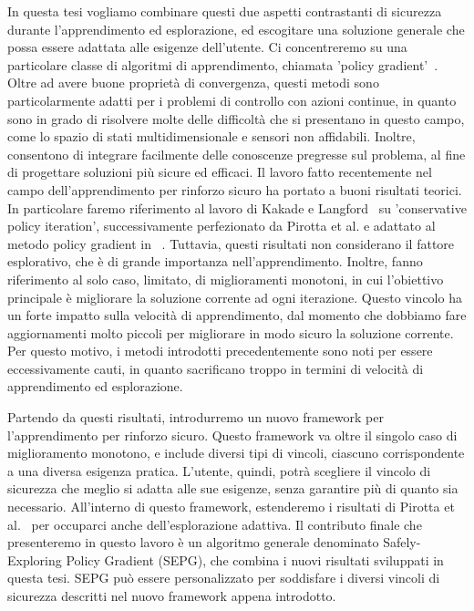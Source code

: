 In questa tesi vogliamo combinare questi due aspetti contrastanti di sicurezza durante l'apprendimento ed esplorazione, ed escogitare una soluzione generale che possa essere adattata alle esigenze dell'utente. Ci concentreremo su una particolare classe di algoritmi di apprendimento, chiamata 'policy gradient'~\cite{peters}. Oltre ad avere buone proprietà di convergenza, questi metodi sono particolarmente adatti per i problemi di controllo con azioni continue, in quanto sono in grado di risolvere molte delle difficoltà che si presentano in questo campo, come lo spazio di stati multidimensionale e sensori non affidabili. Inoltre, consentono di integrare facilmente delle conoscenze pregresse sul problema, al fine di progettare soluzioni più sicure ed efficaci. Il lavoro fatto recentemente nel campo dell'apprendimento per rinforzo sicuro ha portato a buoni risultati teorici. In particolare faremo riferimento al lavoro di Kakade e Langford~\cite{Kakade02approximatelyoptimal} su 'conservative policy iteration', successivamente perfezionato da Pirotta et al. \cite{safe_iteration} e adattato al metodo policy gradient in ~\cite{adaptive_step}. Tuttavia, questi risultati non considerano il fattore esplorativo, che è di grande importanza nell'apprendimento. Inoltre, fanno riferimento al solo caso, limitato, di miglioramenti monotoni, in cui l'obiettivo principale è migliorare la soluzione corrente ad ogni iterazione. Questo vincolo ha un forte impatto sulla velocità di apprendimento, dal momento che dobbiamo fare aggiornamenti molto piccoli per migliorare in modo sicuro la soluzione corrente. Per questo motivo, i metodi introdotti precedentemente sono noti per essere eccessivamente cauti, in quanto sacrificano troppo in termini di velocità di apprendimento ed esplorazione.

Partendo da questi risultati, introdurremo un nuovo framework per l'apprendimento per rinforzo sicuro. Questo framework va oltre il singolo caso di miglioramento monotono, e include diversi tipi di vincoli, ciascuno corrispondente a una diversa esigenza pratica. L'utente, quindi, potrà scegliere il vincolo di sicurezza che meglio si adatta alle sue esigenze, senza garantire più di quanto sia necessario. All'interno di questo framework, estenderemo i risultati di Pirotta et al.~\cite{adaptive_step} per occuparci anche dell'esplorazione adattiva. Il contributo finale che presenteremo in questo lavoro è un algoritmo generale denominato Safely-Exploring Policy Gradient (SEPG), che combina i nuovi risultati sviluppati in questa tesi. SEPG può essere personalizzato per soddisfare i diversi vincoli di sicurezza descritti nel nuovo framework appena introdotto.